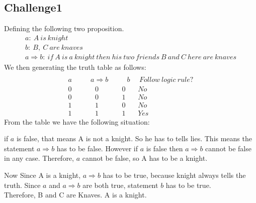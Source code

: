\documentclass[11pt]{article}
\newcommand{\impl}{\mathbin{\Rightarrow}}
\begin{document}
\subsection*{Challenge1}
Defining the following two proposition.
\[
\begin{array}{lr}
    a:\ A\ is\ knight
\\  b:\ B,\ C\ are\ knaves
\\  a \impl b:\ if\ A\ is\ a\ knight\ then\ his\ two\ friends\ B\ and\ C\ here\ are\ knaves
\end{array}
\]
We then generating the truth table as follows:
\[
\begin{array}{lr}
\\  a\ \ \ \ \ \ \ \ \ \ \ \ a \impl b\ \ \ \ \ \ \ \ \ \ \ \ b\ \ \ \ \ \ Follow\ logic\ rule?
\\  0\ \ \ \ \ \ \ \ \ \ \ \ \ \ \ 0 \ \ \ \ \ \ \ \ \ \ \ \ \ \ \ 0\ \ \ \ \ \ \ \ No
\\  0\ \ \ \ \ \ \ \ \ \ \ \ \ \ \ 0 \ \ \ \ \ \ \ \ \ \ \ \ \ \ \ 1\ \ \ \ \ \ \ \ No
\\  1\ \ \ \ \ \ \ \ \ \ \ \ \ \ \ 1 \ \ \ \ \ \ \ \ \ \ \ \ \ \ \ 0\ \ \ \ \ \ \ \ No
\\  1\ \ \ \ \ \ \ \ \ \ \ \ \ \ \ 1 \ \ \ \ \ \ \ \ \ \ \ \ \ \ \ 1\ \ \ \ \ \ \ \ Yes
\end{array}
\]
From the table we have the following situation:

if $a$ is false, that means A is not a knight. So he has to tells lies. This means the statement $a \impl b$ has to be false. However if $a$ is false then $a \impl b$ cannot be false in any case. Therefore, $a$ cannot be false, so A has to be a knight.

Now Since A is a knight, $a \impl b$ has to be true, because knight always tells the truth. Since $a$ and $a \impl b$ are both true, statement $b$ has to be true.\\
Therefore, B and C are Knaves. A is a knight.
\end{document}
